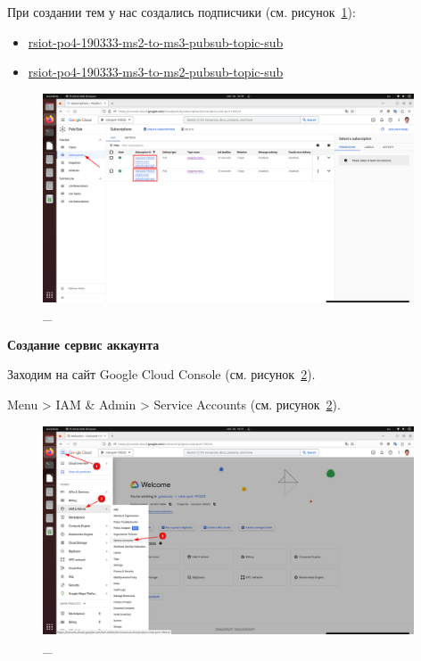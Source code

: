 \documentclass[12pt, a4paper, simple]{eskdtext}
\begin{document}
  \newpage

  При создании тем у нас создались подписчики \cite{GoogleCloudPubSubSubscriptions} (см. рисунок~\ref{fig:4}):
  \begin{itemize}
      \item \underline{rsiot-po4-190333-ms2-to-ms3-pubsub-topic-sub}
      \item \underline{rsiot-po4-190333-ms3-to-ms2-pubsub-topic-sub}
  \end{itemize}

  \begin{figure}[!h]
    \centering
    \includegraphics[width=11cm]
    {images/2023-02-26_16-39-41.png}
    \caption{\_}
    \label{fig:4}
  \end{figure}

  \textbf{Создание сервис аккаунта}

  Заходим на сайт Google Cloud Console \cite{GoogleCloudConsole} (см. рисунок~\ref{fig:5}).

  Menu > IAM \& Admin > Service Accounts \cite{GoogleCloudServiceAccount} (см. рисунок~\ref{fig:5}).

  \begin{figure}[!h]
    \centering
    \includegraphics[width=11cm]
    {images/2023-02-26_16-41-55.png}
    \caption{\_}
    \label{fig:5}
  \end{figure}
\end{document}
